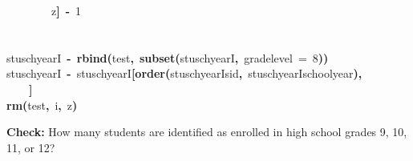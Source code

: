\documentclass[12pt]{article}
\makeatletter
\newcommand{\hlnumber}[1]{\textcolor[rgb]{0,0,0}{#1}}%
\newcommand{\hlfunctioncall}[1]{\textcolor[rgb]{0.501960784313725,0,0.329411764705882}{\textbf{#1}}}%
\newcommand{\hlkeyword}[1]{\textcolor[rgb]{0,0,0}{\textbf{#1}}}%
\newcommand{\hlassignement}[1]{\textcolor[rgb]{0,0,0}{\textbf{#1}}}%
\newcommand{\hlsymbol}[1]{\textcolor[rgb]{0,0,0}{#1}}%
\newcommand{\hlstd}[1]{\textcolor[rgb]{0,0,0}{#1}}%
\newenvironment{kframe}{%
 \def\FrameCommand##1{\hskip\@totalleftmargin \hskip-\fboxsep
 \colorbox{shadecolor}{##1}\hskip-\fboxsep
     \hskip-\linewidth \hskip-\@totalleftmargin \hskip\columnwidth}%
 \MakeFramed {\advance\hsize-\width
   \@totalleftmargin\z@ \linewidth\hsize
   \@setminipage}}%
 {\par\unskip\endMakeFramed}
\newenvironment{knitrout}{}{} %
\renewenvironment{knitrout}{\begin{footnotesize}}{\end{footnotesize}}
\makeatother
\begin{document}
\begin{knitrout}
\begin{kframe}
\begin{flushleft}
\hlstd{}{\ }{\ }{\ }{\ }{\ }{\ }{\ }{\ }\hlsymbol{z}\hlkeyword{]}{\ }\hlassignement{\usebox{\hlnormalsizeboxlessthan}-}{\ }\hlnumber{1}\hspace*{\fill}\\
\hlstd{}\hlkeyword{\usebox{\hlnormalsizeboxclosebrace}}\hspace*{\fill}\\
\hlstd{}\hspace*{\fill}\\
\hlstd{}\hlsymbol{stuschyearI}{\ }\hlassignement{\usebox{\hlnormalsizeboxlessthan}-}{\ }\hlfunctioncall{rbind}\hlkeyword{(}\hlsymbol{test}\hlkeyword{,}{\ }\hlfunctioncall{subset}\hlkeyword{(}\hlsymbol{stuschyearI}\hlkeyword{,}{\ }\hlsymbol{grade\usebox{\hlnormalsizeboxunderscore}level}{\ }\usebox{\hlnormalsizeboxlessthan}={\ }\hlnumber{8}\hlkeyword{)}\hlkeyword{)}\hspace*{\fill}\\
\hlstd{}\hlsymbol{stuschyearI}{\ }\hlassignement{\usebox{\hlnormalsizeboxlessthan}-}{\ }\hlsymbol{stuschyearI}\hlkeyword{[}\hlfunctioncall{order}\hlkeyword{(}\hlsymbol{stuschyearI}\hlkeyword{\usebox{\hlnormalsizeboxdollar}}\hlsymbol{sid}\hlkeyword{,}{\ }\hlsymbol{stuschyearI}\hlkeyword{\usebox{\hlnormalsizeboxdollar}}\hlsymbol{school\usebox{\hlnormalsizeboxunderscore}year}\hlkeyword{)}\hlkeyword{,}\hspace*{\fill}\\
\hlstd{}{\ }{\ }{\ }{\ }\hlkeyword{]}\hspace*{\fill}\\
\hlstd{}\hlfunctioncall{rm}\hlkeyword{(}\hlsymbol{test}\hlkeyword{,}{\ }\hlsymbol{i}\hlkeyword{,}{\ }\hlsymbol{z}\hlkeyword{)}\mbox{}
\normalfont
\end{flushleft}
\end{kframe}
\end{knitrout}


\textbf{Check:} How many students are identified as enrolled in high school grades 9, 10, 11, or 12?
\end{document}
